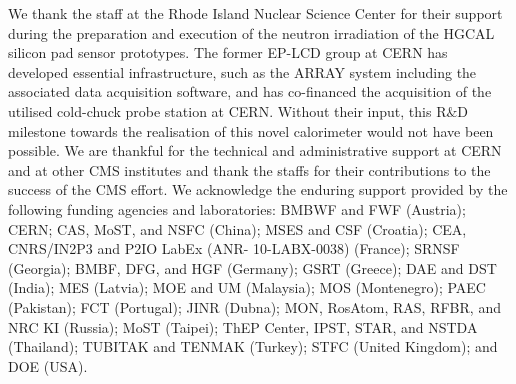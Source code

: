 \acknowledgments
We thank the staff at the Rhode Island Nuclear Science Center for their support during the preparation and execution of the neutron irradiation of the HGCAL silicon pad sensor prototypes.
The former EP-LCD group at CERN has developed essential infrastructure, such as the ARRAY system including the associated data acquisition software, and has co-financed the acquisition of the utilised cold-chuck probe station at CERN.
Without their input, this R$\&$D milestone towards the realisation of this novel calorimeter would not have been possible. 
We are thankful for the technical and administrative support at CERN and at other CMS institutes and thank the staffs for their contributions to the success of the CMS effort. 
We acknowledge the enduring support provided by the following funding agencies and laboratories: BMBWF and FWF (Austria); CERN; CAS, MoST, and NSFC (China); MSES and CSF (Croatia); CEA, CNRS/IN2P3 and P2IO LabEx (ANR- 10-LABX-0038) (France); SRNSF (Georgia); BMBF, DFG, and HGF (Germany); GSRT (Greece); DAE and DST (India); MES (Latvia); MOE and UM (Malaysia); MOS (Montenegro); PAEC (Pakistan); FCT (Portugal); JINR (Dubna); MON, RosAtom, RAS, RFBR, and NRC KI (Russia); MoST (Taipei); ThEP Center, IPST, STAR, and NSTDA (Thailand); TUBITAK and TENMAK (Turkey); STFC (United Kingdom); and DOE (USA).
